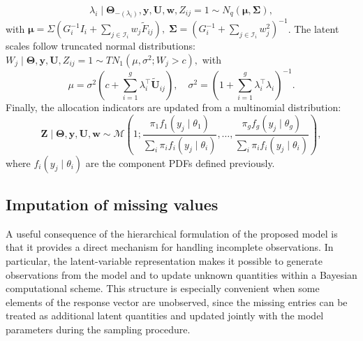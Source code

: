 \documentclass[twoside]{article}
\theoremstyle{definition}
\begin{document}
\[
\lambda_i \mid \bm\Theta_{-(\lambda_i)}, \bm y, \bm U, \bm w, Z_{ij}=1 \sim N_q(\bm \mu, \bm \Sigma),
\]
with $ \bm \mu = \Sigma \left( G_i^{-1} I_i + \sum_{j \in \mathcal{I}_i} w_j \tilde{F}_{ij} \right), 
\;
\bm \Sigma = \left( G_i^{-1} + \sum_{j \in \mathcal{I}_i} w_j^2 \right)^{-1} $. The latent scales follow truncated normal distributions: $ W_j \mid \bm\Theta, \bm y, \bm U, Z_{ij}=1 \sim TN_1(\mu, \sigma^2; W_j>c), $
with
\[
\mu = \sigma^2 \left( c + \sum_{i=1}^g \lambda_i^\top \tilde{\bm U}_{ij} \right), 
\quad 
\sigma^2 = \left(1 + \sum_{i=1}^g \lambda_i^\top \lambda_i \right)^{-1}.
\]
Finally, the allocation indicators are updated from a multinomial distribution:
\[
\bm Z \mid \bm\Theta, \bm y, \bm U, \bm w \sim \mathcal{M}\left(1; \frac{\pi_1 f_1(y_j \mid \theta_1)}{\sum_i \pi_i f_i(y_j \mid \theta_i)}, \dots, \frac{\pi_g f_g(y_j \mid \theta_g)}{\sum_i \pi_i f_i(y_j \mid \theta_i)}\right),
\]
where $f_i(y_j \mid \theta_i)$ are the component PDFs defined previously.

\subsection{Imputation of missing values}
\vspace{-0.5cm}
A useful consequence of the hierarchical formulation of the proposed model is that it provides a direct mechanism for handling incomplete observations. In particular, the latent-variable representation makes it possible to generate observations from the model and to update unknown quantities within a Bayesian computational scheme. This structure is especially convenient when some elements of the response vector are unobserved, since the missing entries can be treated as additional latent quantities and updated jointly with the model parameters during the sampling procedure.
\end{document}
